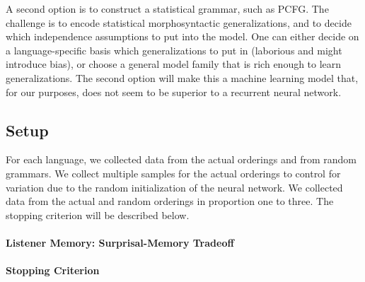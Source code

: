 \documentclass[11pt,letterpaper]{article}
\begin{document}
A second option is to construct a statistical grammar, such as PCFG.
The challenge is to encode statistical morphosyntactic generalizations, and to decide which independence assumptions to put into the model.
One can either decide on a language-specific basis which generalizations to put in (laborious and might introduce bias), or choose a general model family that is rich enough to learn generalizations.
The second option will make this a machine learning model that, for our purposes, does not seem to be superior to a recurrent neural network.





\subsection{Setup}

For each language, we collected data from the actual orderings and from random grammars.
We collect multiple samples for the actual orderings to control for variation due to the random initialization of the neural network.
We collected data from the actual and random orderings in proportion one to three.
The stopping criterion will be described below.



\paragraph{Listener Memory: Surprisal-Memory Tradeoff}



\paragraph{Stopping Criterion}
\end{document}
